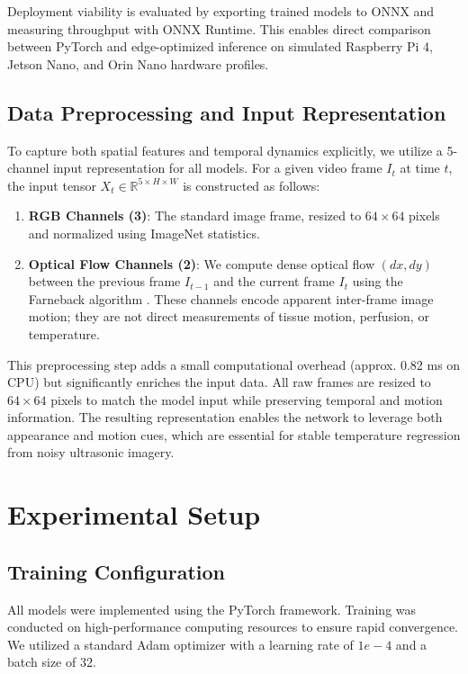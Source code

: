 \documentclass[conference]{IEEEtran}
\begin{document}
Deployment viability is evaluated by exporting trained models to ONNX and measuring throughput with ONNX Runtime. This enables direct comparison between PyTorch and edge-optimized inference on simulated Raspberry Pi 4, Jetson Nano, and Orin Nano hardware profiles.

\subsection{Data Preprocessing and Input Representation}


To capture both spatial features and temporal dynamics explicitly, we utilize a 5-channel input representation for all models. For a given video frame $I_t$ at time $t$, the input tensor $X_t \in \mathbb{R}^{5 \times H \times W}$ is constructed as follows:
\begin{enumerate}
    \item \textbf{RGB Channels (3)}: The standard image frame, resized to $64 \times 64$ pixels and normalized using ImageNet statistics.
    \item \textbf{Optical Flow Channels (2)}: We compute dense optical flow $(dx, dy)$ between the previous frame $I_{t-1}$ and the current frame $I_t$ using the Farneback algorithm \cite{farneback2003two}. These channels encode apparent inter-frame image motion; they are not direct measurements of tissue motion, perfusion, or temperature.
\end{enumerate}
This preprocessing step adds a small computational overhead (approx. 0.82 ms on CPU) but significantly enriches the input data. All raw frames are resized to $64\times 64$ pixels to match the model input while preserving temporal and motion information. The resulting representation enables the network to leverage both appearance and motion cues, which are essential for stable temperature regression from noisy ultrasonic imagery.





\section{Experimental Setup}\label{sec:experiments}

\subsection{Training Configuration}
All models were implemented using the PyTorch framework. Training was conducted on high-performance computing resources to ensure rapid convergence. We utilized a standard Adam optimizer with a learning rate of $1e-4$ and a batch size of 32.
\end{document}
